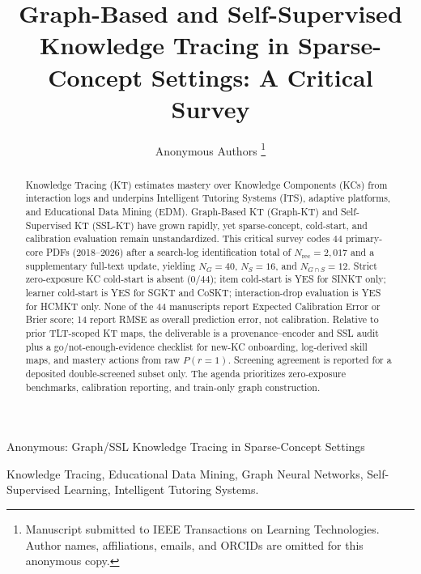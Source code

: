 \documentclass[lettersize,journal]{IEEEtran}
\begin{document}
\title{Graph-Based and Self-Supervised Knowledge Tracing in Sparse-Concept Settings: A Critical Survey}
\author{Anonymous Authors
\thanks{Manuscript submitted to IEEE Transactions on Learning Technologies.
Author names, affiliations, emails, and ORCIDs are omitted for this anonymous copy.}
}
%
{Anonymous: Graph/SSL Knowledge Tracing in Sparse-Concept Settings}

\maketitle

\begin{abstract}
Knowledge Tracing (KT) estimates mastery over Knowledge Components (KCs) from interaction logs and underpins Intelligent Tutoring Systems (ITS), adaptive platforms, and Educational Data Mining (EDM). Graph-Based KT (Graph-KT) and Self-Supervised KT (SSL-KT) have grown rapidly, yet sparse-concept, cold-start, and calibration evaluation remain unstandardized. This critical survey codes 44 primary-core PDFs (2018--2026) after a search-log identification total of $N_{\mathrm{rec}}=2{,}017$ and a supplementary full-text update, yielding $N_G=40$, $N_S=16$, and $N_{G\cap S}=12$. Strict zero-exposure KC cold-start is absent ($0/44$); item cold-start is YES for SINKT only; learner cold-start is YES for SGKT and CoSKT; interaction-drop evaluation is YES for HCMKT only. None of the 44 manuscripts report Expected Calibration Error or Brier score; 14 report RMSE as overall prediction error, not calibration. Relative to prior TLT-scoped KT maps, the deliverable is a provenance--encoder and SSL audit plus a go/not-enough-evidence checklist for new-KC onboarding, log-derived skill maps, and mastery actions from raw $P(r=1)$. Screening agreement is reported for a deposited double-screened subset only. The agenda prioritizes zero-exposure benchmarks, calibration reporting, and train-only graph construction.
\end{abstract}

\begin{IEEEkeywords}
Knowledge Tracing, Educational Data Mining, Graph Neural Networks, Self-Supervised Learning, Intelligent Tutoring Systems.
\end{IEEEkeywords}
\end{document}
